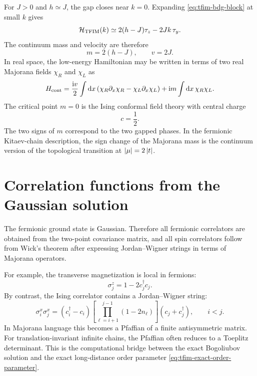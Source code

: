 For $J>0$ and $h\simeq J$, the gap closes near $k=0$.  Expanding
\cref{eq:tfim-bdg-block} at small $k$ gives
\begin{equation}
\label{eq:tfim-majorana-bdg-expansion}
    \mathcal{H}_{\rm TFIM}(k)
    \simeq
    2(h-J)\tau_z
    -2Jk\,\tau_y.
\end{equation}
The continuum mass and velocity are therefore
\begin{equation}
\label{eq:tfim-majorana-mass-velocity}
    m=2(h-J),
    \qquad
    v=2J.
\end{equation}
In real space, the low-energy Hamiltonian may be written in terms of two real
Majorana fields $\chi_R$ and $\chi_L$ as
\begin{equation}
\label{eq:tfim-majorana-field-theory}
    H_{\rm cont}
    =
    \frac{\mathrm{i} v}{2}\int \mathrm{d} x
    \left(
        \chi_R\partial_x\chi_R
        -
        \chi_L\partial_x\chi_L
    \right)
    +
    \mathrm{i} m\int \mathrm{d} x\,\chi_R\chi_L.
\end{equation}
The critical point $m=0$ is the Ising conformal field theory with central charge
\begin{equation}
\label{eq:tfim-central-charge}
    c=\frac12.
\end{equation}
The two signs of $m$ correspond to the two gapped phases.  In the fermionic
Kitaev-chain description, the sign change of the Majorana mass is the continuum
version of the topological transition at $\left|\mu\right|=2\left|t\right|$.

\section{Correlation functions from the Gaussian solution}
\label{sec:tfim-correlators-gaussian}

The fermionic ground state is Gaussian.  Therefore all fermionic correlators are
obtained from the two-point covariance matrix, and all spin correlators follow
from Wick's theorem after expressing Jordan--Wigner strings in terms of Majorana
operators.

For example, the transverse magnetization is local in fermions:
\begin{equation}
\label{eq:tfim-z-magnetization-fermions}
    \sigma_j^z=1-2c_j^\dagger c_j.
\end{equation}
By contrast, the Ising correlator contains a Jordan--Wigner string:
\begin{equation}
\label{eq:tfim-x-correlator-string}
    \sigma_i^x\sigma_j^x
    =
    \left(c_i^\dagger-c_i\right)
    \left[\prod_{\ell=i+1}^{j-1}(1-2n_\ell)\right]
    \left(c_j+c_j^\dagger\right),
    \qquad i<j.
\end{equation}
In Majorana language this becomes a Pfaffian of a finite antisymmetric matrix.
For translation-invariant infinite chains, the Pfaffian often reduces to a
Toeplitz determinant.  This is the computational bridge between the exact
Bogoliubov solution and the exact long-distance order parameter
\cref{eq:tfim-exact-order-parameter}.

